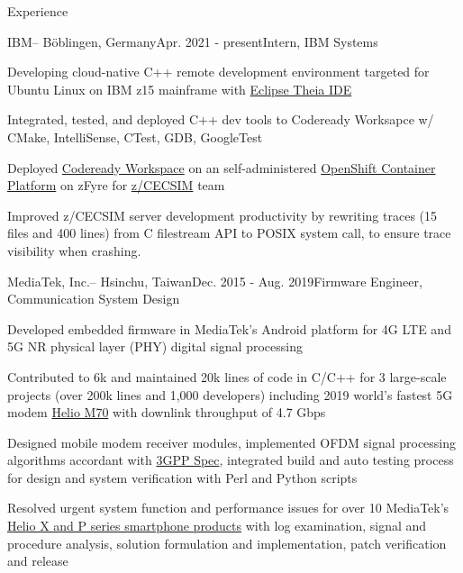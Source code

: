 \documentclass{resume} %
\begin{document}
\begin{rSection}{Experience}

\begin{rSubsection}{IBM}{--  Böblingen, Germany}{Apr. 2021 - present}{Intern, IBM Systems}
\item Developing cloud-native C++ remote development environment targeted for Ubuntu Linux on IBM z15 mainframe with \href{https://theia-ide.org/}{Eclipse Theia IDE}
\item Integrated, tested, and deployed C++ dev tools to Codeready Worksapce w/ CMake, IntelliSense, CTest, GDB, GoogleTest
\item  Deployed \href{https://www.redhat.com/en/technologies/jboss-middleware/codeready-workspaces}{Codeready Workspace} on an self-administered \href{https://www.redhat.com/en/technologies/cloud-computing/openshift/container-platform}{OpenShift Container Platform} on zFyre for \href{https://ieeexplore.ieee.org/document/5389024}{z/CECSIM} team
\item Improved z/CECSIM server development productivity by rewriting traces (15 files and 400 lines) from C filestream API to POSIX system call, to ensure trace visibility when crashing.
\end{rSubsection}

\begin{rSubsection}{MediaTek, Inc.}{--  Hsinchu, Taiwan}{Dec. 2015 - Aug. 2019}{Firmware Engineer, Communication System Design}

\item Developed embedded firmware in MediaTek’s Android platform for 4G LTE and 5G NR physical layer (PHY) digital signal processing
\item Contributed to 6k and maintained 20k lines of code in C/C++ for 3 large-scale projects (over 200k lines and 1,000 developers) including 2019 world’s fastest 5G modem  \href{https://www.mediatek.com/blog/heres-5gs-real-speed-live-connection-demo
}{Helio M70} with downlink throughput of 4.7 Gbps
\item Designed mobile modem receiver modules, implemented OFDM signal processing algorithms accordant with  \href{https://www.3gpp.org/specifications}{3GPP Spec}, integrated build and auto testing process for design and system verification with Perl and Python scripts 
\item Resolved urgent system function and performance issues for over 10 MediaTek’s \href{https://www.mediatek.com/products/smartphones}{Helio X and P series smartphone products} with log examination, signal and procedure analysis, solution formulation and implementation, patch verification and release


\end{rSubsection}
\end{rSection}
\end{document}
